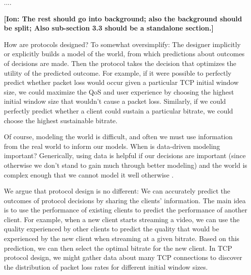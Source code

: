 ....

{\bf [Ion: The rest should go into background; also the background should be split; Also sub-section 3.3 should be a standalone section.]}

How are protocols designed?  To somewhat oversimplify: The designer implicitly or explicitly builds a model of the world, from which predictions about outcomes of decisions are made.  Then the protocol takes the decision that optimizes the utility of the predicted outcome.  For example, if it were possible to perfectly predict whether packet loss would occur given a particular TCP initial window size, we could maximize the QoS and user experience by choosing the highest initial window size that wouldn't cause a packet loss.  Similarly, if we could perfectly predict whether a client could sustain a particular bitrate, we could choose the highest sustainable bitrate.

Of course, modeling the world is difficult, and often we must use information from the real world to inform our models.  When is data-driven modeling important?  Generically, using data is helpful if our decisions are important (since otherwise we don't stand to gain much through better modeling) and the world is complex enough that we cannot model it well otherwise .

We argue that protocol design is no different: We can accurately predict the outcomes of protocol decisions by sharing the clients' information. The main idea is to use the performance of existing clients to predict the performance of another client. For example, when a new client starts streaming a video, we can use the quality experienced by other clients to predict the quality that would be experienced by the new client when streaming at a given bitrate. Based on this prediction, we can then select the optimal bitrate for the new client.  In TCP protocol design, we might gather data about many TCP connections to discover the distribution of packet loss rates for different initial window sizes.  

